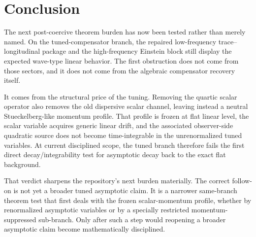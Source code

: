 \documentclass[11pt]{article}
\begin{document}
\section{Conclusion}

The next post-coercive theorem burden has now been tested rather than merely named. On the tuned-compensator branch, the repaired low-frequency trace--longitudinal package and the high-frequency Einstein block still display the expected wave-type linear behavior. The first obstruction does not come from those sectors, and it does not come from the algebraic compensator recovery itself.

It comes from the structural price of the tuning. Removing the quartic scalar operator also removes the old dispersive scalar channel, leaving instead a neutral Stueckelberg-like momentum profile. That profile is frozen at flat linear level, the scalar variable acquires generic linear drift, and the associated observer-side quadratic source does not become time-integrable in the unrenormalized tuned variables. At current disciplined scope, the tuned branch therefore fails the first direct decay/integrability test for asymptotic decay back to the exact flat background.

That verdict sharpens the repository’s next burden materially. The correct follow-on is not yet a broader tuned asymptotic claim. It is a narrower same-branch theorem test that first deals with the frozen scalar-momentum profile, whether by renormalized asymptotic variables or by a specially restricted momentum-suppressed sub-branch. Only after such a step would reopening a broader asymptotic claim become mathematically disciplined.
\end{document}
